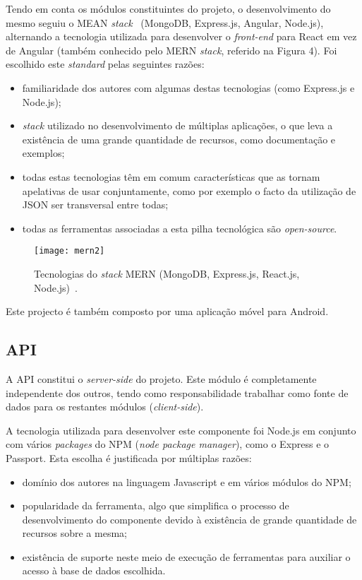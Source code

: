 Tendo em conta os módulos constituintes do projeto, o desenvolvimento do mesmo seguiu o MEAN \textit{stack}~\cite{Williams2017} (MongoDB, Express.js, Angular, Node.js), alternando a tecnologia utilizada para desenvolver o \textit{front-end} para React em vez de Angular (também conhecido pelo MERN \textit{stack}, referido na Figura 4). Foi escolhido este \textit{standard} pelas seguintes razões:
\begin{itemize}
	\item familiaridade dos autores com algumas destas tecnologias (como Express.js e Node.js);
	\item \textit{stack} utilizado no desenvolvimento de múltiplas aplicações, o que leva a existência de uma grande quantidade de recursos, como documentação e exemplos;
	\item todas estas tecnologias têm em comum características que as tornam apelativas de usar conjuntamente, como por exemplo o facto da utilização de JSON ser transversal entre todas;
	\item todas as ferramentas associadas a esta pilha tecnológica são \textit{open-source}.
\end{itemize}

\begin{figure}[h]
	\centering
	\texttt{[image: mern2]}
	\caption{Tecnologias do \textit{stack} MERN (MongoDB, Express.js, React.js, Node.js)~\cite{Cooke2020}.}
\end{figure}

Este projecto é também composto por uma aplicação móvel para Android.

\subsection{API}
A API constitui o \textit{server-side} do projeto. Este módulo é completamente independente dos outros, tendo como responsabilidade trabalhar como fonte de dados para os restantes módulos (\textit{client-side}). \par \medskip 

A tecnologia utilizada para desenvolver este componente foi Node.js em conjunto com vários \textit{packages} do NPM (\textit{node package manager}), como o Express e o Passport. Esta escolha é justificada por múltiplas razões:
\begin{itemize}
	\item domínio dos autores na linguagem Javascript e em vários módulos do NPM;
	\item popularidade da ferramenta, algo que simplifica o processo de desenvolvimento do componente devido à existência de grande quantidade de recursos sobre a mesma;
	\item existência de suporte neste meio de execução de ferramentas para auxiliar o acesso à base de dados escolhida.
\end{itemize}

